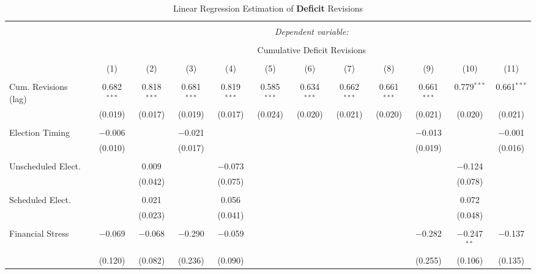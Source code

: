 
\begin{table}[!htbp] \centering 
  \caption{Linear Regression Estimation of \textbf{Deficit} Revisions} 
  \label{deficit_results} 
\tiny 
\begin{tabular}{@{\extracolsep{5pt}}lccccccccccc} 
\\[-1.8ex]\hline 
\hline \\[-1.8ex] 
 & \multicolumn{11}{c}{\textit{Dependent variable:}} \\ 
\cline{2-12} 
\\[-1.8ex] & \multicolumn{11}{c}{Cumulative Deficit Revisions} \\ 
\\[-1.8ex] & (1) & (2) & (3) & (4) & (5) & (6) & (7) & (8) & (9) & (10) & (11)\\ 
\hline \\[-1.8ex] 
 Cum. Revisions (lag) & 0.682$^{***}$ & 0.818$^{***}$ & 0.681$^{***}$ & 0.819$^{***}$ & 0.585$^{***}$ & 0.634$^{***}$ & 0.662$^{***}$ & 0.661$^{***}$ & 0.661$^{***}$ & 0.779$^{***}$ & 0.661$^{***}$ \\ 
  & (0.019) & (0.017) & (0.019) & (0.017) & (0.024) & (0.020) & (0.021) & (0.020) & (0.021) & (0.020) & (0.021) \\ 
  & & & & & & & & & & & \\ 
 Election Timing & $-$0.006 &  & $-$0.021 &  &  &  &  &  & $-$0.013 &  & $-$0.001 \\ 
  & (0.010) &  & (0.017) &  &  &  &  &  & (0.019) &  & (0.016) \\ 
  & & & & & & & & & & & \\ 
 Unscheduled Elect. &  & 0.009 &  & $-$0.073 &  &  &  &  &  & $-$0.124 &  \\ 
  &  & (0.042) &  & (0.075) &  &  &  &  &  & (0.078) &  \\ 
  & & & & & & & & & & & \\ 
 Scheduled Elect. &  & 0.021 &  & 0.056 &  &  &  &  &  & 0.072 &  \\ 
  &  & (0.023) &  & (0.041) &  &  &  &  &  & (0.048) &  \\ 
  & & & & & & & & & & & \\ 
 Financial Stress & $-$0.069 & $-$0.068 & $-$0.290 & $-$0.059 &  &  &  &  & $-$0.282 & $-$0.247$^{**}$ & $-$0.137 \\ 
  & (0.120) & (0.082) & (0.236) & (0.090) &  &  &  &  & (0.255) & (0.106) & (0.135) \\ 

\end{tabular}
\end{table}
